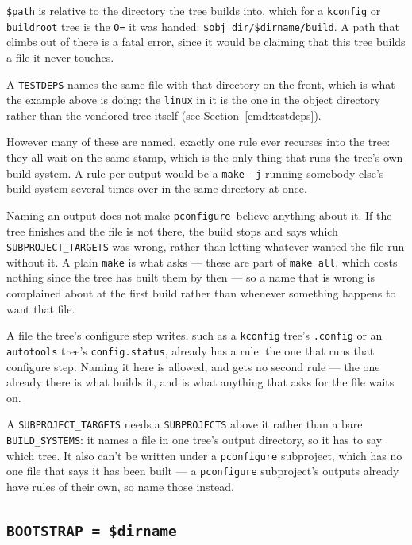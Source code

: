 \documentclass{article}
\newcommand{\pconfigure}{\texttt{pconfigure}}
\begin{document}
\texttt{\$path} is relative to the directory the tree builds into,
which for a \texttt{kconfig} or \texttt{buildroot} tree is the
\texttt{O=} it was handed:
\texttt{\$obj\_dir/\$dirname/build}.  A path that
climbs out of there is a fatal error, since it would be claiming that
this tree builds a file it never touches.

A \texttt{TESTDEPS} names the same file with that directory on the
front, which is what the example above is doing: the \texttt{linux}
in it is the one in the object directory rather than the vendored
tree itself (see Section~\ref{cmd:testdeps}).

However many of these are named, exactly one rule ever recurses into
the tree: they all wait on the same stamp, which is the only thing
that runs the tree's own build system.  A rule per output would be a
\texttt{make -j} running somebody else's build system several times
over in the same directory at once.

Naming an output does not make \pconfigure\ believe anything about
it.  If the tree finishes and the file is not there, the build stops
and says which \texttt{SUBPROJECT\_TARGETS} was wrong, rather than
letting whatever wanted the file run without it.  A plain
\texttt{make} is what asks --- these are part of \texttt{make all},
which costs nothing since the tree has built them by then --- so a
name that is wrong is complained about at the first build rather than
whenever something happens to want that file.

A file the tree's configure step writes, such as a \texttt{kconfig}
tree's \texttt{.config} or an \texttt{autotools} tree's
\texttt{config.status}, already has a rule: the one that runs that
configure step.  Naming it here is allowed, and gets no second rule
--- the one already there is what builds it, and is what anything
that asks for the file waits on.

A \texttt{SUBPROJECT\_TARGETS} needs a \texttt{SUBPROJECTS} above it
rather than a bare \texttt{BUILD\_SYSTEMS}: it names a file in one
tree's output directory, so it has to say which tree.  It also can't
be written under a \texttt{pconfigure} subproject, which has no one
file that says it has been built --- a \texttt{pconfigure} subproject's
outputs already have rules of their own, so name those instead.

\subsection{\texttt{BOOTSTRAP = \$dirname} \label{cmd:bootstrap}}
\end{document}
